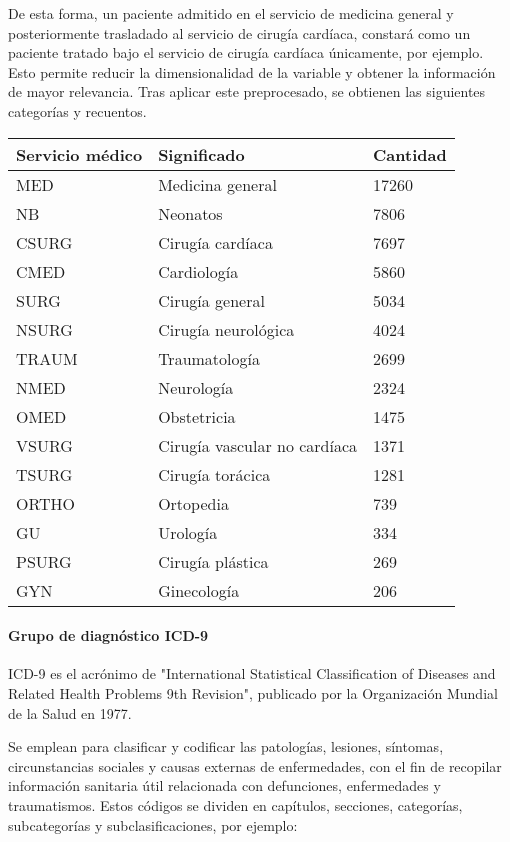 \documentclass{report}
\begin{document}
De esta forma, un paciente admitido en el servicio de medicina general y
posteriormente trasladado al servicio de cirugía cardíaca, constará como
un paciente tratado bajo el servicio de cirugía cardíaca únicamente, por
ejemplo. Esto permite reducir la dimensionalidad de la variable y obtener la
información de mayor relevancia. Tras aplicar este preprocesado, se
obtienen las siguientes categorías y recuentos.

\begin{longtable}[]{@{}lll@{}}
\toprule
Servicio médico & Significado & Cantidad\tabularnewline
\midrule
\endhead
MED & Medicina general & 17260\tabularnewline
NB & Neonatos & 7806\tabularnewline
CSURG & Cirugía cardíaca & 7697\tabularnewline
CMED & Cardiología & 5860\tabularnewline
SURG & Cirugía general & 5034\tabularnewline
NSURG & Cirugía neurológica & 4024\tabularnewline
TRAUM & Traumatología & 2699\tabularnewline
NMED & Neurología & 2324\tabularnewline
OMED & Obstetricia & 1475\tabularnewline
VSURG & Cirugía vascular no cardíaca & 1371\tabularnewline
TSURG & Cirugía torácica & 1281\tabularnewline
ORTHO & Ortopedia & 739\tabularnewline
GU & Urología & 334\tabularnewline
PSURG & Cirugía plástica & 269\tabularnewline
GYN & Ginecología & 206\tabularnewline
\bottomrule
\end{longtable}
\newpage
\paragraph{Grupo de diagnóstico ICD-9}


ICD-9 es el acrónimo de "International Statistical Classification of
Diseases and Related Health Problems 9th Revision", publicado por la
Organización Mundial de la Salud en 1977.

Se emplean para clasificar y codificar las patologías, lesiones,
síntomas, circunstancias sociales y causas externas de enfermedades, con
el fin de recopilar información sanitaria útil relacionada con
defunciones, enfermedades y traumatismos. Estos códigos se dividen en capítulos, secciones, categorías,
subcategorías y subclasificaciones, por ejemplo:

\end{document}
